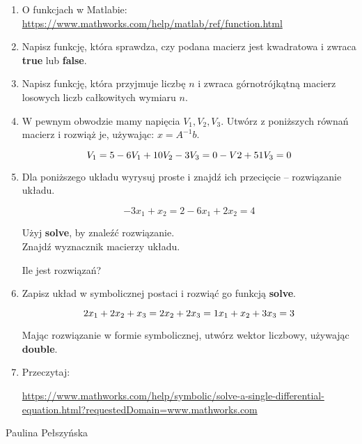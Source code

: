 \documentclass[12pt]{amsbook}
\newenvironment{bottompar}{\par\vspace*{\fill}}{\clearpage}
\theoremstyle{definition}
\begin{document}
\begin{enumerate}

\item O funkcjach w Matlabie: 
\url{https://www.mathworks.com/help/matlab/ref/function.html}


\item Napisz funkcję, która sprawdza, czy podana macierz jest kwadratowa i zwraca \textbf{true} lub \textbf{false}.

\item Napisz funkcję, która przyjmuje liczbę $n$ i zwraca górnotrójkątną macierz losowych liczb całkowitych wymiaru $n$.

\item W pewnym obwodzie mamy napięcia $V_1, V_2, V_3$.
Utwórz z poniższych równań macierz i rozwiąż je, używając: $x = A^{-1}b$.

$$V_1 = 5\\
-6V_1 + 10V_2 -3V_3 = 0\\
-V 2 +51V_3 = 0$$



\item Dla poniższego układu wyrysuj proste i znajdź ich przecięcie -- rozwiązanie układu.

$$-3x_1 +x_2 = 2
-6x_1 + 2x_2 = 4$$

Użyj \textbf{solve}, by znaleźć rozwiązanie.\\
Znajdź wyznacznik macierzy układu.

Ile jest rozwiązań?

\item Zapisz układ w symbolicznej postaci i rozwiąć go funkcją \textbf{solve}.

$$2x_1 + 2x_2 + x_3 = 2\\
x_2 + 2x_3 = 1\\
x_1 + x_2 + 3x_3 = 3$$

Mając rozwiązanie w formie symbolicznej, utwórz wektor liczbowy, używając \textbf{double}.


\item Przeczytaj:

\url{https://www.mathworks.com/help/symbolic/solve-a-single-differential-equation.html?requestedDomain=www.mathworks.com}



\end{enumerate}
\begin{bottompar}
\begin{flushright}
Paulina Pełszyńska
\end{flushright}
\end{bottompar}
\end{document}
